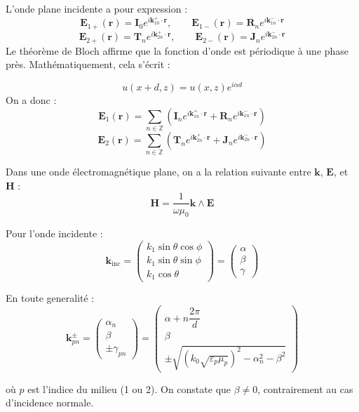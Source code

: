 \documentclass{article}
\begin{document}
L’onde plane incidente a pour expression :
\[
\mathbf{E}_{1+}(\mathbf{r}) = \mathbf{I}_0 e^{i \mathbf{k}_{10}^{+} \cdot \mathbf{r}}, \qquad
\mathbf{E}_{1-}(\mathbf{r}) = \mathbf{R}_n e^{i \mathbf{k}_{1n}^{-} \cdot \mathbf{r}}
\]
\[
\mathbf{E}_{2+}(\mathbf{r}) = \mathbf{T}_n e^{i \mathbf{k}_{2n}^{+} \cdot \mathbf{r}}, \qquad
\mathbf{E}_{2-}(\mathbf{r}) = \mathbf{J}_n e^{i \mathbf{k}_{2n}^{-} \cdot \mathbf{r}}
\]
Le théorème de Bloch affirme que la fonction d'onde est périodique à une phase près. Mathématiquement, cela s’écrit :

\[
u(x + d, z) = u(x, z) e^{i \alpha d}
\]
On a donc :
\[
\mathbf{E}_1(\mathbf{r}) = \sum_{n \in \mathbb{Z}} \left( \mathbf{I}_n e^{i \mathbf{k}_{1n}^{+} \cdot \mathbf{r}} + \mathbf{R}_n e^{i \mathbf{k}_{1n}^{-} \cdot \mathbf{r}} \right)
\]
\[
\mathbf{E}_2(\mathbf{r}) = \sum_{n \in \mathbb{Z}} \left( \mathbf{T}_n e^{i \mathbf{k}_{2n}^{+} \cdot \mathbf{r}} + \mathbf{J}_n e^{i \mathbf{k}_{2n}^{-} \cdot \mathbf{r}} \right)
\]

Dans une onde électromagnétique plane, on a la relation suivante entre $\mathbf{k}$, $\mathbf{E}$, et $\mathbf{H}$ :
\[
\mathbf{H} = \frac{1}{\omega \mu_0} \mathbf{k} \wedge \mathbf{E}
\]

\medskip

Pour l’onde incidente :
\[
\mathbf{k}_{\text{inc}} = 
\begin{pmatrix}
k_1 \sin\theta \cos\phi \\
k_1 \sin\theta \sin\phi \\
k_1 \cos\theta
\end{pmatrix}
=
\begin{pmatrix}
\alpha \\
\beta \\
\gamma
\end{pmatrix}
\]

En toute generalité : 
\medskip
\[
\mathbf{k}_{pn}^{\pm} =
\begin{pmatrix}
\alpha_n \\
\beta \\
\pm \gamma_{pn}
\end{pmatrix}
=
\begin{pmatrix}
\alpha + n \dfrac{2\pi}{d} \\
\beta \\
\pm \sqrt{\left(k_0 \sqrt{\varepsilon_p \mu_p}\right)^2 - \alpha_n^2 - \beta^2}
\end{pmatrix}
\]

où $p$ est l'indice du milieu (1 ou 2). On constate que $\beta \neq 0$, contrairement au cas d'incidence normale.
\end{document}
